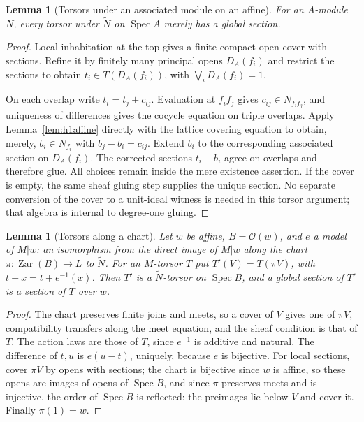 \documentclass[11pt]{amsart}
\newtheorem{lemma}[theorem]{Lemma}
\theoremstyle{definition}\newtheorem{definition}[theorem]{Definition}
\theoremstyle{remark}\newtheorem{remark}[theorem]{Remark}
\newcommand{\OO}{\mathcal O}
\newcommand{\Spec}{\operatorname{Spec}}
\begin{document}
\begin{lemma}[Torsors under an associated module on an affine]
\label{lem:associated-affine-torsor}
For an $A$-module $N$, every torsor under $\widetilde N$ on
$\Spec A$ merely has a global section.
\end{lemma}
\begin{proof}
Local inhabitation at the top gives a finite compact-open cover with
sections. Refine it by finitely many principal opens $D_A(f_i)$ and
restrict the sections to obtain $t_i\in T(D_A(f_i))$, with
$\bigvee_iD_A(f_i)=1$.

On each overlap write $t_i=t_j+c_{ij}$. Evaluation at $f_if_j$
gives $c_{ij}\in N_{f_if_j}$, and uniqueness of differences gives
the cocycle equation on triple overlaps. Apply
Lemma~\ref{lem:h1affine} directly with the lattice covering equation
to obtain, merely, $b_i\in N_{f_i}$ with $b_j-b_i=c_{ij}$.
Extend $b_i$ to the corresponding associated section on $D_A(f_i)$.
The corrected sections $t_i+b_i$ agree on overlaps and therefore glue.
All choices remain inside the mere existence assertion. If the cover
is empty, the same sheaf gluing step supplies the unique section.
No separate conversion of the cover to a unit-ideal witness is needed
in this torsor argument; that algebra is internal to degree-one gluing.
\end{proof}

\begin{lemma}[Torsors along a chart]\label{lem:torsor-chart}
Let $w$ be affine, $B=\OO(w)$, and $e$ a model of $M|w$: an
isomorphism from the direct image of $M|w$ along the chart
$\pi:\operatorname{Zar}(B)\to L$ to $\widetilde N$. For an $M$-torsor
$T$ put $T'(V)=T(\pi V)$, with $t+x=t+e^{-1}(x)$. Then $T'$ is a
$\widetilde N$-torsor on $\Spec B$, and a global section of $T'$ is a
section of $T$ over $w$.
\end{lemma}
\begin{proof}
The chart preserves finite joins and meets, so a cover of $V$ gives one
of $\pi V$, compatibility transfers along the meet equation, and the
sheaf condition is that of $T$. The action laws are those of $T$, since
$e^{-1}$ is additive and natural. The difference of $t,u$ is
$e(u-t)$, uniquely, because $e$ is bijective. For local sections, cover
$\pi V$ by opens with sections; the chart is bijective since $w$ is
affine, so these opens are images of opens of $\Spec B$, and since $\pi$
preserves meets and is injective, the order of $\Spec B$ is reflected:
the preimages lie below $V$ and cover it. Finally $\pi(1)=w$.
\end{proof}
\end{document}
